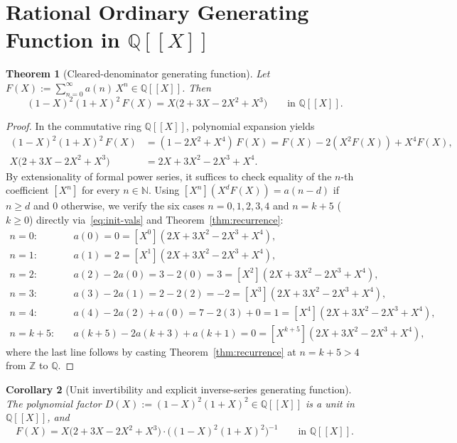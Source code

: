 \documentclass[11pt]{article}
\newcommand{\llbracket}{[\![}
\newcommand{\rrbracket}{]\!]}
\newtheorem{theorem}{Theorem}[section]
\newtheorem{corollary}[theorem]{Corollary}
\theoremstyle{definition}
\newcommand{\N}{\mathbb{N}}
\newcommand{\Z}{\mathbb{Z}}
\newcommand{\Q}{\mathbb{Q}}
\begin{document}
\section{Rational Ordinary Generating Function in \texorpdfstring{$\Q\llbracket X \rrbracket$}{Q[[X]]}}

\begin{theorem}[Cleared-denominator generating function]
\label{thm:gf}
Let $F(X) := \sum_{n=0}^{\infty} a(n)\,X^n \in \Q\llbracket X \rrbracket$. Then
\begin{equation}
\label{eq:gf-cleared}
(1 - X)^2 (1 + X)^2 \, F(X) = X\bigl(2 + 3X - 2X^2 + X^3\bigr) \qquad \text{in }\Q\llbracket X \rrbracket.
\end{equation}
\end{theorem}

\begin{proof}
In the commutative ring $\Q\llbracket X \rrbracket$, polynomial expansion yields
\begin{align*}
(1 - X)^2 (1 + X)^2 \, F(X) &= (1 - 2X^2 + X^4)\,F(X) = F(X) - 2(X^2 F(X)) + X^4 F(X), \\
X\bigl(2 + 3X - 2X^2 + X^3\bigr) &= 2X + 3X^2 - 2X^3 + X^4.
\end{align*}
By extensionality of formal power series, it suffices to check equality of the $n$-th coefficient $[X^n]$ for every $n \in \N$. Using $[X^n](X^d F(X)) = a(n - d)$ if $n \ge d$ and $0$ otherwise, we verify the six cases $n = 0, 1, 2, 3, 4$ and $n = k + 5$ ($k \ge 0$) directly via~\eqref{eq:init-vals} and Theorem~\ref{thm:recurrence}:
\begin{align*}
n = 0:\quad & a(0) = 0 = [X^0](2X + 3X^2 - 2X^3 + X^4), \\
n = 1:\quad & a(1) = 2 = [X^1](2X + 3X^2 - 2X^3 + X^4), \\
n = 2:\quad & a(2) - 2a(0) = 3 - 2(0) = 3 = [X^2](2X + 3X^2 - 2X^3 + X^4), \\
n = 3:\quad & a(3) - 2a(1) = 2 - 2(2) = -2 = [X^3](2X + 3X^2 - 2X^3 + X^4), \\
n = 4:\quad & a(4) - 2a(2) + a(0) = 7 - 2(3) + 0 = 1 = [X^4](2X + 3X^2 - 2X^3 + X^4), \\
n = k + 5:\quad & a(k + 5) - 2a(k + 3) + a(k + 1) = 0 = [X^{k+5}](2X + 3X^2 - 2X^3 + X^4),
\end{align*}
where the last line follows by casting Theorem~\ref{thm:recurrence} at $n = k + 5 > 4$ from $\Z$ to $\Q$.
\end{proof}

\begin{corollary}[Unit invertibility and explicit inverse-series generating function]
\label{cor:unit-inv}
The polynomial factor $D(X) := (1 - X)^2(1 + X)^2 \in \Q\llbracket X \rrbracket$ is a unit in $\Q\llbracket X \rrbracket$, and
\begin{equation}
\label{eq:gf-inv}
F(X) = X\bigl(2 + 3X - 2X^2 + X^3\bigr) \cdot \bigl((1 - X)^2 (1 + X)^2\bigr)^{-1} \qquad \text{in }\Q\llbracket X \rrbracket.
\end{equation}
\end{corollary}
\end{document}
